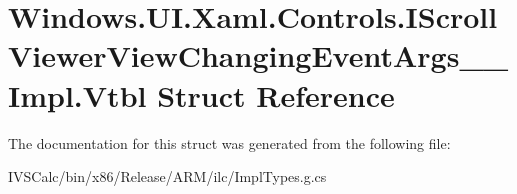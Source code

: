 \hypertarget{struct_windows_1_1_u_i_1_1_xaml_1_1_controls_1_1_i_scroll_viewer_view_changing_event_args_____impl_1_1_vtbl}{}\section{Windows.\+U\+I.\+Xaml.\+Controls.\+I\+Scroll\+Viewer\+View\+Changing\+Event\+Args\+\_\+\+\_\+\+Impl.\+Vtbl Struct Reference}
\label{struct_windows_1_1_u_i_1_1_xaml_1_1_controls_1_1_i_scroll_viewer_view_changing_event_args_____impl_1_1_vtbl}


The documentation for this struct was generated from the following file\+:\begin{DoxyCompactItemize}
\item 
I\+V\+S\+Calc/bin/x86/\+Release/\+A\+R\+M/ilc/Impl\+Types.\+g.\+cs\end{DoxyCompactItemize}
